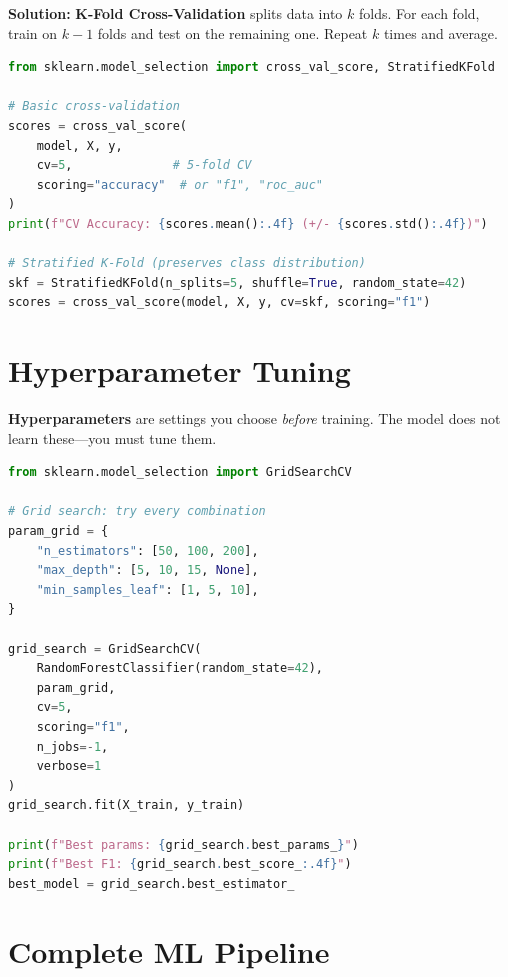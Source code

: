 \documentclass[12pt, a4paper, oneside]{book}
\begin{document}
\textbf{Solution:} \textbf{K-Fold Cross-Validation} splits data into $k$ folds. For each fold, train on $k-1$ folds and test on the remaining one. Repeat $k$ times and average.

\begin{lstlisting}[language=Python, caption={Cross-validation}]
from sklearn.model_selection import cross_val_score, StratifiedKFold

# Basic cross-validation
scores = cross_val_score(
    model, X, y,
    cv=5,              # 5-fold CV
    scoring="accuracy"  # or "f1", "roc_auc"
)
print(f"CV Accuracy: {scores.mean():.4f} (+/- {scores.std():.4f})")

# Stratified K-Fold (preserves class distribution)
skf = StratifiedKFold(n_splits=5, shuffle=True, random_state=42)
scores = cross_val_score(model, X, y, cv=skf, scoring="f1")
\end{lstlisting}

\section{Hyperparameter Tuning}

\textbf{Hyperparameters} are settings you choose \emph{before} training. The model does not learn these---you must tune them.

\begin{lstlisting}[language=Python, caption={Hyperparameter tuning}]
from sklearn.model_selection import GridSearchCV

# Grid search: try every combination
param_grid = {
    "n_estimators": [50, 100, 200],
    "max_depth": [5, 10, 15, None],
    "min_samples_leaf": [1, 5, 10],
}

grid_search = GridSearchCV(
    RandomForestClassifier(random_state=42),
    param_grid,
    cv=5,
    scoring="f1",
    n_jobs=-1,
    verbose=1
)
grid_search.fit(X_train, y_train)

print(f"Best params: {grid_search.best_params_}")
print(f"Best F1: {grid_search.best_score_:.4f}")
best_model = grid_search.best_estimator_
\end{lstlisting}

\section{Complete ML Pipeline}
\end{document}
